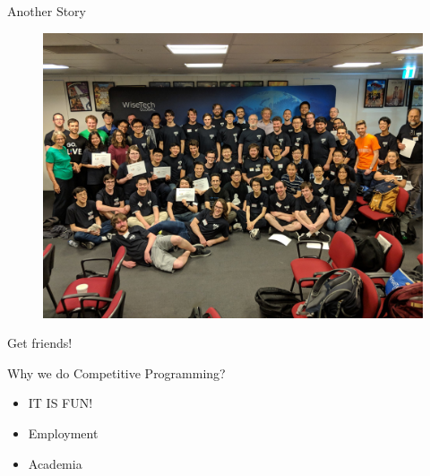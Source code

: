\begin{frame}{Another Story}
  \begin{figure}
  \centering
  \includegraphics[width=.7\textwidth]{pic/regional-2018.jpg}
  \end{figure}
  Get friends!
\end{frame}

\begin{frame}{Why we do Competitive Programming?}
  \begin{itemize}
    \item<2-> IT IS FUN!
    \item<3-> Employment
    \item<4-> Academia
  \end{itemize}
\end{frame}
